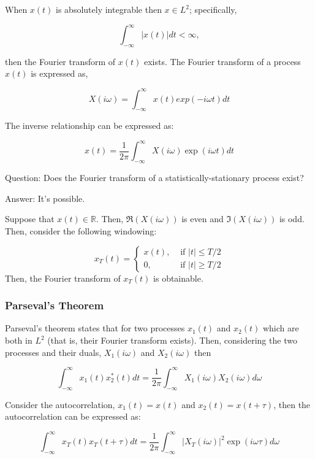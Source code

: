 \documentclass{article}
\begin{document}
   When  $ x(t) $ is absolutely integrable then $ x \in L^2 $; specifically,

   \[
      \int_{-\infty}^{\infty}|x(t)| dt < \infty ,
   \]

   then the Fourier transform of  $ x(t) $ exists. The Fourier transform of a
   process  $ x(t) $ is expressed as,

   \[
      X(i\omega) = \int_{-\infty}^{\infty} x(t) exp(-i \omega t) dt
   \]

   The inverse relationship can be expressed as:

   \[
      x(t) = \frac{1}{2\pi}\int_{-\infty}^{\infty} X(i\omega) \exp(i \omega t) dt
   \]

   Question: Does the Fourier transform of a statistically-stationary process
   exist?

   Answer: It's possible.

   Suppose that $ x(t) \in \mathds{R} $. Then,  $ \Re(X(i\omega)) $ is even and
   $ \Im(X(i\omega)) $ is odd. Then, consider the following windowing:

   \begin{equation}
      x_{T}(t) =
      \begin{cases}
         x(t), &\text{ if } |t| \le T/2 \\
         0, &\text{ if } |t| \ge T/2
      \end{cases}
   \end{equation}
   Then, the Fourier transform of $ x_{T}(t) $ is obtainable.

   \subsubsection{Parseval's Theorem}
   
   Parseval's theorem states that for two processes  $ x_1(t) $ and $x_{2}(t)$
   which are both in  $ L^2 $ (that is, their Fourier transform exists). Then,
   considering the two processes and their duals,  $ X_{1}(i\omega) $ and  $
X_{2}(i\omega) $ then

\[
   \int_{-\infty}^{\infty} x_{1}(t)x_{2}^*(t) dt = \frac{1}{2\pi}
   \int_{-\infty}^{\infty} X_{1}(i\omega)X_{2}(i\omega) d\omega
\]

Consider the autocorrelation,  $ x_{1}(t) = x(t) $ and  $ x_{2}(t) = x(t+\tau)
$, then the autocorrelation can be expressed as:

\[
   \int_{-\infty}^{\infty}x_{T}(t)x_{T}(t+\tau) dt = \frac{1}{2\pi}
   \int_{-\infty}^{\infty} | X_T(i\omega) |^2 \exp(i\omega \tau) d\omega
\]
\end{document}
